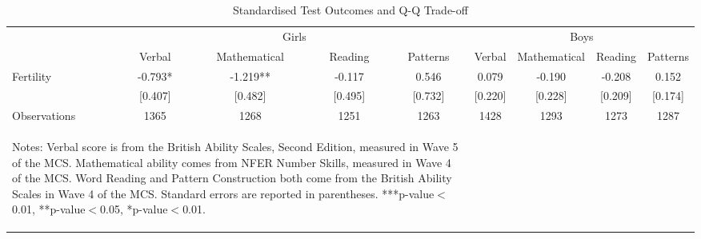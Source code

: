 \begin{table}[htbp]\centering
\def\sym#1{\ifmmode^{#1}\else\(^{#1}\)\fi}
\caption{Standardised Test Outcomes and Q-Q Trade-off}
\begin{tabular}{l*{8}{c}}
\toprule
                    &\multicolumn{4}{c}{Girls}                                      &\multicolumn{4}{c}{Boys}                                       \\\cmidrule(lr){2-5}\cmidrule(lr){6-9}
                    &      Verbal   &Mathematical   &     Reading   &    Patterns   &      Verbal   &Mathematical   &     Reading   &    Patterns   \\
\midrule
Fertility           &      -0.793*  &      -1.219** &      -0.117   &       0.546   &       0.079   &      -0.190   &      -0.208   &       0.152   \\
                    &     [0.407]   &     [0.482]   &     [0.495]   &     [0.732]   &     [0.220]   &     [0.228]   &     [0.209]   &     [0.174]   \\
\midrule
Observations        &        1365   &        1268   &        1251   &        1263   &        1428   &        1293   &        1273   &        1287   \\
\bottomrule\multicolumn{5}{p{14.6cm}}{\begin{footnotesize}        
Notes: Verbal score is from the British Ability Scales, Second Edition, measured in Wave 5 of the MCS. Mathematical ability comes from NFER Number Skills, measured in Wave 4 of the MCS. Word Reading and Pattern Construction both come from the British Ability Scales in Wave 4 of the MCS. Standard errors are reported in parentheses. ***p-value$<$0.01, **p-value$<$0.05, *p-value$<$0.01.                                
\end{footnotesize}}\end{tabular}\end{table}
